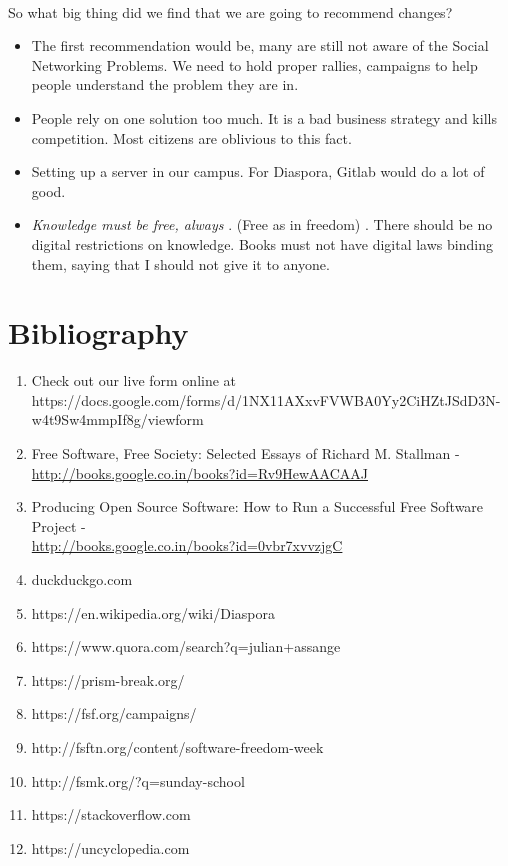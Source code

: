 \documentclass[11pt]{book}
\begin{document}
\\So what big thing did we find that we are going to recommend changes? 
\begin{itemize}
	\item The first recommendation would be, many are still not aware of the Social Networking Problems.
		We need to hold proper rallies, campaigns to help people understand the problem they are in.
	\item People rely on one solution too much. It is a bad business strategy and kills competition. Most 
		citizens are oblivious to this fact. 
	\item Setting up a server in our campus. For Diaspora, Gitlab would do a lot of good.
	\item \emph{Knowledge must be free, always} . (Free as in freedom) . There should be no digital restrictions on knowledge. 
		Books must not have digital laws binding them, saying that I should not give it to anyone. 

\end{itemize}
\newpage
\chapter{Bibliography}
\begin{enumerate}
	\item Check out our live form online at https://docs.google.com/forms/d/1NX11AXxvFVWBA0Yy2CiHZtJSdD3N-w4t9Sw4mmpIf8g/viewform
	\item Free Software, Free Society: Selected Essays of Richard M. Stallman - \\\url{http://books.google.co.in/books?id=Rv9HewAACAAJ}
	\item Producing Open Source Software: How to Run a Successful Free Software Project - \\\url{http://books.google.co.in/books?id=0vbr7xvvzjgC}
	\item duckduckgo.com
	\item https://en.wikipedia.org/wiki/Diaspora
	\item https://www.quora.com/search?q=julian+assange
	\item https://prism-break.org/
	\item https://fsf.org/campaigns/
	\item http://fsftn.org/content/software-freedom-week
	\item http://fsmk.org/?q=sunday-school
	\item https://stackoverflow.com
	\item https://uncyclopedia.com
\end{enumerate}
\newpage
\end{document}
